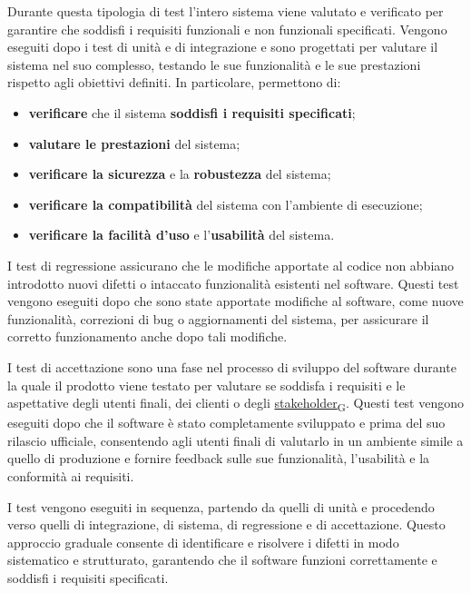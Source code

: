 Durante questa tipologia di test l'intero sistema viene valutato e verificato per garantire che soddisfi i requisiti funzionali e non funzionali specificati. Vengono eseguiti dopo i test di unità e di integrazione e sono progettati per valutare il sistema nel suo complesso, testando le sue funzionalità e le sue prestazioni rispetto agli obiettivi definiti. In particolare, permettono di:
\begin{itemize}
	\item \textbf{verificare} che il sistema \textbf{soddisfi i requisiti specificati};
	\item \textbf{valutare le prestazioni} del sistema;
	\item \textbf{verificare la sicurezza} e la \textbf{robustezza} del sistema;
	\item \textbf{verificare la compatibilità} del sistema con l'ambiente di esecuzione;
	\item \textbf{verificare la facilità d'uso} e l'\textbf{usabilità} del sistema.
\end{itemize}

I test di regressione assicurano che le modifiche apportate al codice non abbiano introdotto nuovi difetti o intaccato funzionalità esistenti nel software. Questi test vengono eseguiti dopo che sono state apportate modifiche al software, come nuove funzionalità, correzioni di bug o aggiornamenti del sistema, per assicurare il corretto funzionamento anche dopo tali modifiche.

I test di accettazione sono una fase nel processo di sviluppo del software durante la quale il prodotto viene testato per valutare se soddisfa i requisiti e le aspettative degli utenti finali, dei clienti o degli \href{https://7last.github.io/docs/rtb/documentazione-interna/glossario\#stakeholder}{stakeholder\textsubscript{G}}. Questi test vengono eseguiti dopo che il software è stato completamente sviluppato e prima del suo rilascio ufficiale, consentendo agli utenti finali di valutarlo in un ambiente simile a quello di produzione e fornire feedback sulle sue funzionalità, l'usabilità e la conformità ai requisiti.

I test vengono eseguiti in sequenza, partendo da quelli di unità e procedendo verso quelli di integrazione, di sistema, di regressione e di accettazione. Questo approccio graduale consente di identificare e risolvere i difetti in modo sistematico e strutturato, garantendo che il software funzioni correttamente e soddisfi i requisiti specificati.

